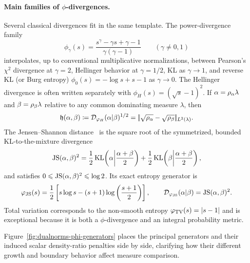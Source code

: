 \paragraph{Main families of $\phi$-divergences.}

Several classical divergences fit in the same template. The power-divergence family
\[
	\phi_\gamma(s)=\frac{s^\gamma-\gamma s+\gamma-1}{\gamma(\gamma-1)}
	\qquad(\gamma\neq0,1)
\]
interpolates, up to conventional multiplicative normalizations, between Pearson's $\chi^2$ divergence at $\gamma=2$, Hellinger behavior at $\gamma=1/2$, KL as $\gamma\to1$, and reverse KL (or Burg entropy) $\phi_0(s)=-\log s+s-1$ as $\gamma\to0$. The Hellinger divergence is often written separately with $\phi_H(s)=(\sqrt s-1)^2$. If $\alpha=\rho_\alpha\lambda$ and $\beta=\rho_\beta\lambda$ relative to any common dominating measure $\lambda$, then
\[
	\mathfrak{h}(\alpha,\beta)
	\coloneqq\mathcal{D}_{\varphi_H}(\alpha|\beta)^{1/2}
	=|\!| \sqrt{\rho_\alpha}-\sqrt{\rho_\beta} |\!|_{L^2(\lambda)}.
\]
The Jensen--Shannon distance~\cite{endres2003new,osterreicher2003new} is the square root of the symmetrized, bounded KL-to-the-mixture divergence
\[
	\operatorname{JS}(\alpha,\beta)^2
	=
	\frac12\operatorname{KL}\!\left(\alpha\middle|\frac{\alpha+\beta}{2}\right)
	+
	\frac12\operatorname{KL}\!\left(\beta\middle|\frac{\alpha+\beta}{2}\right),
\]
and satisfies $0\leqslant\operatorname{JS}(\alpha,\beta)^2\leqslant\log 2$. Its exact entropy generator is
\[
	\varphi_{\operatorname{JS}}(s)
	=\frac12\left[s\log s-(s+1)\log\left( \frac{s+1}{2} \right)\right],
	\qquad
	\mathcal{D}_{\varphi_{\operatorname{JS}}}(\alpha|\beta)=\operatorname{JS}(\alpha,\beta)^2.
\]
Total variation corresponds to the non-smooth entropy $\varphi_{\operatorname{TV}}(s)=|s-1|$ and is exceptional because it is both a $\phi$-divergence and an integral probability metric.

Figure~\ref{fig:dualnorms-phi-generators} places the principal generators and their induced scalar density-ratio penalties side by side, clarifying how their different growth and boundary behavior affect measure comparison.

